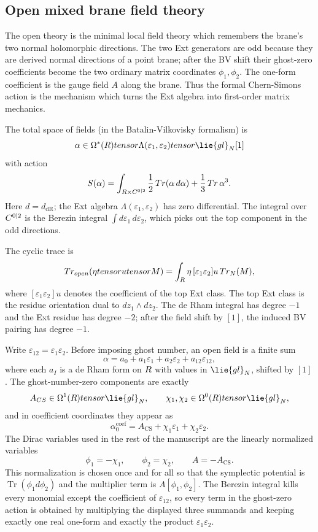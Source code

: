 \documentclass[11pt]{memoir}
\begin{document}
\subsection{Open mixed brane field theory}

The open theory is the minimal local field theory which remembers the brane's two
normal holomorphic directions. The two Ext generators are odd because they are
derived normal directions of a point brane; after the BV shift their ghost-zero
coefficients become the two ordinary matrix coordinates $\phi_1,\phi_2$. The
one-form coefficient is the gauge field $A$ along the brane. Thus the formal
Chern-Simons action is the mechanism which turns the Ext algebra into
first-order matrix mechanics.

The total space of fields (in the Batalin-Vilkovisky formalism) is
$$\alpha \in \Omega^*(\R)\otimes\Lambda(\varepsilon_1,\varepsilon_2)
  \otimes \lie{gl}_N[1]$$
with action
$$S(\alpha)=\int_{R \times C^{0|2}}
  \frac{1}{2}\,Tr(\alpha\, d\alpha)
  + \frac{1}{3}\,Tr\,\alpha^3.$$
Here $d = d_{\mathrm{dR}}$; the Ext algebra
$\Lambda(\varepsilon_1,\varepsilon_2)$ has zero differential. The integral
over $C^{0|2}$ is the Berezin integral $\int d\varepsilon_1\,d\varepsilon_2$,
which picks out the top component in the odd directions.

The cyclic trace is
$$Tr_{open}(\eta tensor utensor M)
  =\int_{R} \eta\,[\varepsilon_1\varepsilon_2]u\,
    Tr_N(M),$$
where $[\varepsilon_1\varepsilon_2]u$ denotes the coefficient of the top Ext
class. The top Ext class is the residue orientation dual to
$dz_1\wedge dz_2$. The de Rham integral has degree $-1$ and the Ext residue has
degree $-2$; after the field shift by $[1]$, the induced BV pairing has degree
$-1$.

\begin{constr}\label{constr:open-field-basis}
  Write $\varepsilon_{12}=\varepsilon_1\varepsilon_2$. Before imposing ghost
  number, an open field is a finite sum
  $$\alpha=a_0+a_1\varepsilon_1+a_2\varepsilon_2+a_{12}\varepsilon_{12},$$
  where each $a_I$ is a de Rham form on $R$ with values in $\lie{gl}_N$,
  shifted by $[1]$. The ghost-number-zero components are exactly
  $$A_{\mathrm{CS}}\in\Omega^1(\R)\otimes\lie{gl}_N,\qquad
    \chi_1,\chi_2\in\Omega^0(\R)\otimes\lie{gl}_N,$$
  and in coefficient coordinates they appear as
  $$\alpha_0^{\mathrm{coef}}
    =A_{\mathrm{CS}}+\chi_1\varepsilon_1+\chi_2\varepsilon_2.$$
  The Dirac variables used in the rest of the manuscript are the
  linearly normalized variables
  $$\phi_1=-\chi_1,\qquad \phi_2=\chi_2,\qquad A=-A_{\mathrm{CS}}.$$
  This normalization is chosen once and for all so that the symplectic
  potential is \(\operatorname{Tr}(\phi_1d\phi_2)\) and the multiplier
  term is \(A[\phi_1,\phi_2]\).
  The Berezin integral kills every monomial except the coefficient of
  $\varepsilon_{12}$, so every term in the ghost-zero action is obtained by
  multiplying the displayed three summands and keeping exactly one real
  one-form and exactly the product $\varepsilon_1\varepsilon_2$.
\end{constr}
\end{document}
